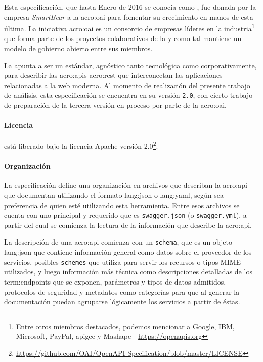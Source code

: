 \subsubsection{}
\label{soa:tecnologias:openapi-spec}

Esta especificación, que hasta Enero de 2016 se conocía como , fue donada por la empresa \textit{SmartBear} a la \gls{acro:oai} para fomentar su crecimiento en manos de esta última. La iniciativa \gls{acro:oai} es un consorcio de empresas líderes en la industria\footnote{Entre otros miembros destacados, podemos mencionar a Google, IBM, Microsoft, PayPal, apigee y Mashape - \url{https://openapis.org}} que forma parte de los proyectos colaborativos de la  y como tal mantiene un modelo de gobierno abierto entre sus miembros.

La {\oaispec} apunta a ser un estándar, agnóstico tanto tecnológica como corporativamente, para describir las \glspl{acro:api} \gls{acro:rest} que interconectan las aplicaciones relacionadas a la web moderna. Al momento de realización del presente trabajo de análisis, esta especificación se encuentra en su versión \texttt{2.0}, con cierto trabajo de preparación de la tercera versión en proceso por parte de la \gls{acro:oai}.

\paragraph{Licencia}

\oaispec está liberado bajo la licencia Apache versión 2.0\footnote{\url{https://github.com/OAI/OpenAPI-Specification/blob/master/LICENSE}}.

\paragraph{Organización}

La especificación define una organización en archivos que describan la \gls{acro:api} que documentan utilizando el formato \gls{lang:json} o \gls{lang:yaml}, según sea preferencia de quien esté utilizando esta herramienta. Entre esos archivos se cuenta con uno principal y requerido que es \texttt{swagger.json} (o \texttt{swagger.yml}), a partir del cual se comienza la lectura de la información que describe la \gls{acro:api}.

La descripción de una \gls{acro:api} comienza con un \texttt{schema}, que es un objeto \gls{lang:json} que contiene información general como datos sobre el proveedor de los servicios, posibles \texttt{schemes} que utiliza para servir los recursos o tipos MIME utilizados, y luego información más técnica como descripciones detalladas de los \glspl{term:endpoint} que se exponen, parámetros y tipos de datos admitidos, protocolos de seguridad y metadatos como categorías para que al generar la documentación puedan agruparse lógicamente los servicios a partir de éstas.

